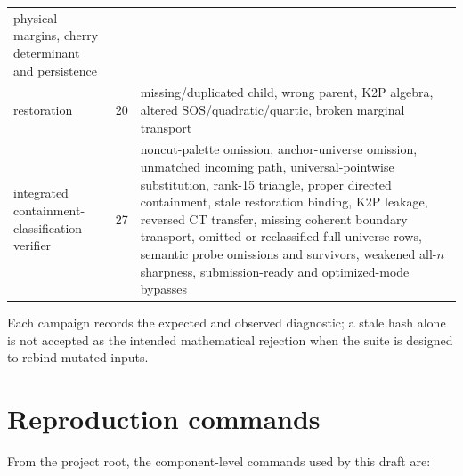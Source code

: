 \documentclass[10pt]{article}
\begin{document}
\begin{longtable}{L{.27\linewidth}rL{.58\linewidth}}
physical margins, cherry determinant and persistence\\
restoration & 20 & missing/duplicated child, wrong parent,
K2P algebra, altered SOS/quadratic/quartic, broken marginal transport\\
integrated containment-classification verifier & 27 & noncut-palette omission,
anchor-universe omission, unmatched incoming path, universal-pointwise substitution,
rank-15 triangle, proper directed containment, stale restoration binding,
K2P leakage, reversed CT transfer, missing coherent boundary transport,
omitted or reclassified full-universe rows, semantic probe omissions and
survivors, weakened all-\(n\) sharpness, submission-ready and optimized-mode
bypasses\\
\bottomrule
\end{longtable}

Each campaign records the expected and observed diagnostic; a stale hash alone
is not accepted as the intended mathematical rejection when the suite is
designed to rebind mutated inputs.

\section{Reproduction commands}

From the project root, the component-level commands used by this draft are:
\end{document}
